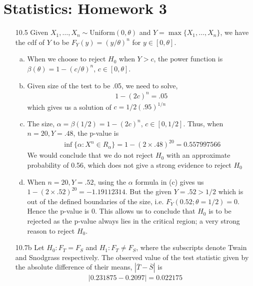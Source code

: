\documentclass[a4paper,10pt]{article}
\theoremstyle{definition}
\begin{document}
\section*{Statistics: Homework 3}

\begin{enumerate}
\item[10.5] Given $X_1,\ldots,X_n \sim \text{Uniform}(0, \theta)$ and $Y = \max\{X_1,\ldots,X_n\}$, we have the cdf of $Y$ to be $F_Y(y)=(y/\theta)^n$ for $y \in [0,\theta]$.
\begin{enumerate}[(a)]
\item When we choose to reject $H_0$ when $Y>c$, the power function is $\beta(\theta) = 1-(c/\theta)^n$, $c \in [0,\theta]$.

\item Given size of the test to be .05, we need to solve,
\begin{align*}
1-(2c)^n = .05
\end{align*}
which gives us a solution of $c = 1/2(.95)^{1/n}$

\item The size, $\alpha = \beta(1/2) = 1- (2c)^{n}$, $c \in [0,1/2]$. Thus, when $n=20, Y = .48$, the p-value is 
\begin{align*}
\inf\{ \alpha:X^n \in R_\alpha\} = 1-(2 \times.48)^{20} = 0.557997566
\end{align*}
We would conclude that we do not reject $H_0$ with an approximate probability of 0.56, which does not give a strong evidence to reject $H_0$
\item When $n=20, Y = .52$, using the $\alpha$ formula in (c) gives us $1-(2\times.52)^{20} = -1.19112314$. But the given $Y=.52>1/2$ which is out of the defined boundaries of the size, i.e. $F_Y(0.52; \theta=1/2)=0$. Hence the p-value is 0. This allows us to conclude that $H_0$ is to be rejected as the p-value always lies in the critical region; a very strong reason to reject $H_0$.
\end{enumerate}

\item[10.7b] 
Let $H_0: F_T = F_S$ and $H_1: F_T \neq F_S$, where the subscripts denote Twain and Snodgrass respectively. The observed value of the test statistic given by the absolute difference of their means, $|\overline{T} - \overline{S}|$ is 
\begin{align*}
|0.231875 - 0.2097 |=0.022175
\end{align*}



\end{enumerate}
\end{document}
